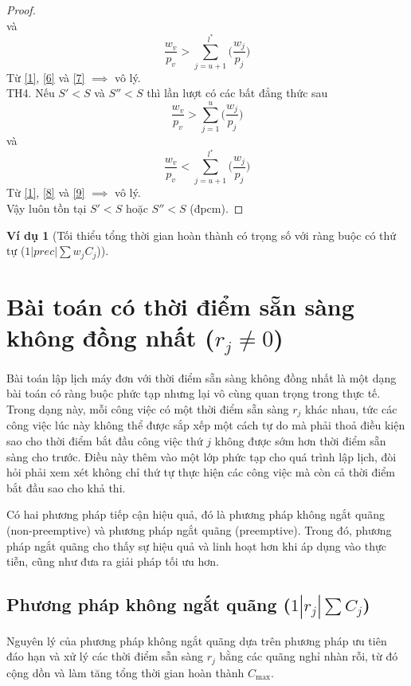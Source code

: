 \documentclass[12pt,a4paper]{report}
\newtheorem{vd}{Ví dụ}
\begin{document}
\begin{proof}
\begin{equation}
	\end{equation}
	và
	\begin{equation} \label{7}
		\frac{w_v}{p_v} > \sum_{j=u+1}^{l^*}\biggl(\frac{w_j}{p_j}\biggr)
	\end{equation}
	Từ \eqref{1}, \eqref{6} và \eqref{7} $\implies$ vô lý. \\
	TH4.
	Nếu $S' < S$ và $S'' < S$ thì lần lượt có các bất đẳng thức sau
	\begin{equation} \label{8}
		\frac{w_v}{p_v} > \sum_{j=1}^{u}\biggl(\frac{w_j}{p_j}\biggr)
	\end{equation}
	và
	\begin{equation} \label{9}
		\frac{w_v}{p_v} < \sum_{j=u+1}^{l^*}\biggl(\frac{w_j}{p_j}\biggr)
	\end{equation}
	Từ \eqref{1}, \eqref{8} và \eqref{9} $\implies$ vô lý. \\
	Vậy luôn tồn tại $S'<S$ hoặc $S''<S$ (đpcm).
\end{proof}

\begin{vd}[Tối thiểu tổng thời gian hoàn thành có trọng số với ràng buộc có thứ tự ($1 | prec | \sum w_j C_j$)]

\end{vd}

\section{Bài toán có thời điểm sẵn sàng không đồng nhất ($r_j \neq 0$)}
Bài toán lập lịch máy đơn với thời điểm sẵn sàng không đồng nhất là một dạng bài toán có ràng buộc phức tạp nhưng lại vô cùng quan trọng trong thực tế. Trong dạng này, mỗi công việc có một thời điểm sẵn sàng $r_j$ khác nhau, tức các công việc lúc này không thể được sắp xếp một cách tự do mà phải thoả điều kiện sao cho thời điểm bắt đầu công việc thứ $j$ không được sớm hơn thời điểm sẵn sàng cho trước. Điều này thêm vào một lớp phức tạp cho quá trình lập lịch, đòi hỏi phải xem xét không chỉ thứ tự thực hiện các công việc mà còn cả thời điểm bắt đầu sao cho khả thi.

Có hai phương pháp tiếp cận hiệu quả, đó là phương pháp không ngắt quãng (non-preemptive) và phương pháp ngắt quãng (preemptive). Trong đó, phương pháp ngắt quãng cho thấy sự hiệu quả và linh hoạt hơn khi áp dụng vào thực tiễn, cũng như đưa ra giải pháp tối ưu hơn.

\subsection{Phương pháp không ngắt quãng ($1 | r_j | \sum C_j$)}
Nguyên lý của phương pháp không ngắt quãng dựa trên phương pháp ưu tiên đáo hạn và xử lý các thời điểm sẵn sàng $r_j$ bằng các quãng nghỉ nhàn rỗi, từ đó cộng dồn và làm tăng tổng thời gian hoàn thành $C_{\max}$.
\end{document}
